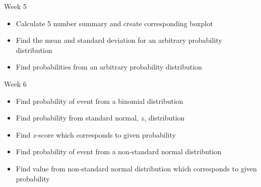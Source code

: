 \documentclass[xcolor=table, aspectratio=169, bigger]{beamer}
\begin{document}
\begin{frame}{Week 5}
\begin{block}{}
\begin{itemize}
\item Calculate 5 number summary and create corresponding boxplot
\item Find the mean and standard deviation for an arbitrary probability distribution
\item Find probabilities from an arbitrary probability distribution
\end{itemize}
\end{block}
\end{frame}


\begin{frame}{Week 6}
\begin{block}{}
\begin{itemize}
\item Find probability of event from a binomial distribution
\item Find probability from standard normal, $z$, distribution
\item Find $z$-score which corresponds to given probability
\item Find probability of event from a non-standard normal distribution
\item Find value from non-standard normal distribution which corresponds to given probability
\end{itemize}
\end{block}
\end{frame}
\end{document}
